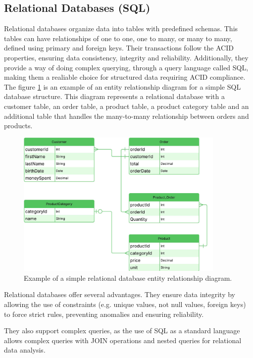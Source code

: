 \subsection{Relational Databases (SQL)}
Relational databases organize data into tables with predefined schemas.
This tables can have relationships of one to one, one to many, or many to many,
defined using primary and foreign keys. Their transactions follow the \gls{ACID}
properties, ensuring data
consistency, integrity and reliability. Additionally, they provide a way of
doing complex querying, through a query language called \gls{SQL}, making them
a realiable choice for structured data requiring \gls{ACID} compliance. The figure
\ref{fig:databases:sql}
is an example of an entity relationship diagram for a simple \gls{SQL} database structure.
This diagram represents a relational database with a customer table, an order table, a product table, a product
category table and an additional table that handles the many-to-many
relationship between orders and products.


\begin{figure}[H]
	\centering
	\includegraphics[width=0.9\textwidth, height=0.5\textheight, keepaspectratio]{Chapters/Figures/Databases/SQL.pdf}
	\caption{Example of a simple relational database entity relationship diagram. }
	\label{fig:databases:sql}
\end{figure}

Relational databases offer several advantages.
They ensure data integrity by allowing the use of constraints (e.g. unique values, not null values,
foreign keys) to force strict rules, preventing anomalies and ensuring
reliability.

They also support complex queries, as the use of \gls{SQL} as a standard
language allows complex queries with JOIN operations and nested queries for relational data analysis.

